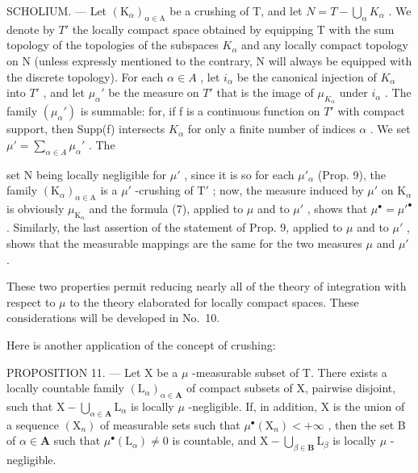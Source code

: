 SCHOLIUM. --- Let \((\mathrm{K}_{\alpha})_{\alpha\in\mathrm{A}}\) be a crushing of T, and let \(N=T-\bigcup_{\alpha}K_{\alpha}\) . We denote by \(T'\) the locally compact space obtained by equipping T with the sum topology of the topologies of the subspaces \(K_{\alpha}\) and any locally compact topology on N (unless expressly mentioned to the contrary, N will always be equipped with the discrete topology). For each \(\alpha \in A\) , let \(i_{\alpha}\) be the canonical injection of \(K_{\alpha}\) into \(T'\) , and let \(\mu_{\alpha}'\) be the measure on \(T'\) that is the image of \(\mu_{K_{\alpha}}\) under \(i_{\alpha}\) . The family \((\mu_{\alpha}')\) is summable: for, if f is a continuous function on \(T'\) with compact support, then Supp(f) intersects \(K_{\alpha}\) for only a finite number of indices \(\alpha\) . We set \(\mu' = \sum_{\alpha \in A} \mu_{\alpha}'\) . The

set N being locally negligible for \(\mu'\) , since it is so for each \(\mu'_{\alpha}\) (Prop. 9), the family \((\mathrm{K}_{\alpha})_{\alpha \in \mathrm{A}}\) is a \(\mu'\) -crushing of \(\mathrm{T}'\) ; now, the measure induced by \(\mu'\) on \(\mathrm{K}_{\alpha}\) is obviously \(\mu_{\mathrm{K}_{\alpha}}\) and the formula (7), applied to \(\mu\) and to \(\mu'\) , shows that \(\mu^{\bullet} = \mu'^{\bullet}\) . Similarly, the last assertion of the statement of Prop. 9, applied to \(\mu\) and to \(\mu'\) , shows that the measurable mappings are the same for the two measures \(\mu\) and \(\mu'\) .

These two properties permit reducing nearly all of the theory of integration with respect to \(\mu\) to the theory elaborated for locally compact spaces. These considerations will be developed in No.~10.

Here is another application of the concept of crushing:

PROPOSITION 11. --- Let X be a \(\mu\) -measurable subset of T. There exists a locally countable family \((\mathrm{L}_{\alpha})_{\alpha \in \mathbf{A}}\) of compact subsets of X, pairwise disjoint, such that \(\mathrm{X} - \bigcup_{\alpha \in \mathbf{A}} \mathrm{L}_{\alpha}\) is locally \(\mu\) -negligible. If, in addition, X is the union of a sequence \((\mathrm{X}_n)\) of measurable sets such that \(\mu^{\bullet}(\mathrm{X}_n) < +\infty\) , then the set B of \(\alpha \in \mathbf{A}\) such that \(\mu^{\bullet}(\mathrm{L}_{\alpha}) \neq 0\) is countable, and \(\mathrm{X} - \bigcup_{\beta \in \mathbf{B}} \mathrm{L}_{\beta}\) is locally \(\mu\) -negligible.

